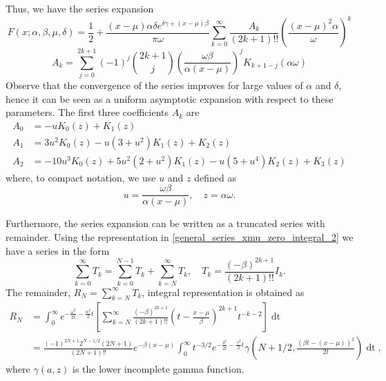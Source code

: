 \documentclass[10pt,a4paper,oneside]{article}
\numberwithin{equation}{section}
\begin{document}
Thus, we have the series expansion
\begin{equation}\label{general_expansion_xmu_small_bessel}
F(x;\alpha, \beta, \mu, \delta) = \frac{1}{2} + \frac{(x-\mu)\alpha\delta e^{\delta \gamma + (x -\mu)\beta}}{\pi \omega}\sum_{k=0}^{\infty} \frac{A_k}{(2k+1)!!}\left(\frac{(x-\mu)^2\alpha}{\omega}\right)^k
\end{equation}
\begin{equation}
A_k = \sum_{j=0}^{2k+1} (-1)^j \binom{2k+1}{j} \left(\frac{\omega \beta}{\alpha (x-\mu)}\right)^j K_{k + 1 - j}(\alpha \omega)
\end{equation}
Observe that the convergence of the series improves for large values of $\alpha$ and $\delta$, hence it can be seen as a uniform asymptotic expansion with respect to these parameters. The first three coefficients $A_k$ are
\begin{align*}
A_0 &= -u K_0(z) + K_1(z)\\
A_1 &= 3u^2 K_0(z) - u(3 + u^2) K_1(z) + K_2(z)\\
A_2 &= -10u^3 K_0(z) + 5u^2(2 + u^2) K_1(z) - u(5 + u^4) K_2(z) + K_3(z)
\end{align*}
where, to compact notation, we use $u$ and $z$ defined as
\begin{equation}
u = \frac{\omega \beta}{\alpha (x-\mu)}, \quad z = \alpha \omega.
\end{equation}

Furthermore, the series expansion can be written as a truncated series with remainder. Using the representation in \eqref{general_series_xmu_zero_integral_2} we have a series in the form
\begin{equation}
\sum_{k=0}^{\infty} T_k = \sum_{k=0}^{N-1}T_k + \sum_{k=N}^{\infty} T_k, \quad T_k = \frac{(-\beta)^{2k+1}}{(2k+1)!!} I_k.
\end{equation}
The remainder, $R_N = \sum_{k=N}^{\infty} T_k$, integral representation is obtained as
\begin{align}\label{general_xmu_remainder_integral}
R_N &= \int_0^{\infty} e^{-\frac{\omega^2}{2t} - \frac{\alpha^2}{2}t} \left[ \sum_{k=N}^{\infty}\frac{(-\beta)^{2k+1}}{(2k+1)!!} \left(t - \frac{x-\mu}{\beta}\right)^{2k+1} t^{-k-2}\right] \mathop{dt}\\
&= \frac{(-1)^{2N + 1} 2^{N - 1/2} (2N + 1)}{(2N + 1)!!} e^{-\beta(x-\mu)} \int_0^{\infty} t^{-3/2} e^{-\frac{\delta^2}{2t} - \frac{\gamma^2}{2}t} \gamma\left(N + 1/2 , \frac{(\beta t - (x-\mu))^2}{2t}\right) \mathop{dt},
\end{align}
where $\gamma(a, z)$ is the lower incomplete gamma function. 
\end{document}
